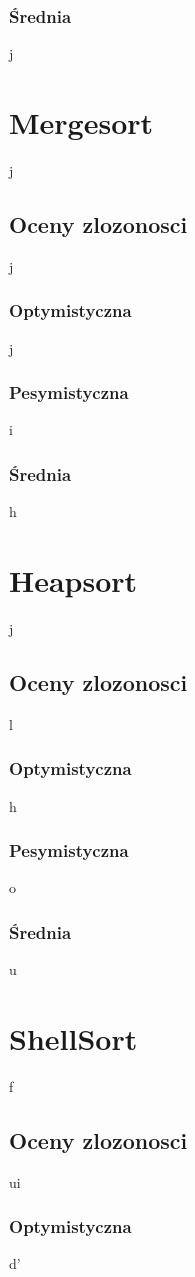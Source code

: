 \subsubsection{Średnia}
j

\section{Mergesort}
j
\subsection{Oceny zlozonosci}
j
\subsubsection{Optymistyczna}
j
\subsubsection{Pesymistyczna}
i
\subsubsection{Średnia}
h
\section{Heapsort}
j
\subsection{Oceny zlozonosci}
l
\subsubsection{Optymistyczna}
h
\subsubsection{Pesymistyczna}
o
\subsubsection{Średnia}
u
\section{ShellSort}
f
\subsection{Oceny zlozonosci}
ui
\subsubsection{Optymistyczna}
d'
